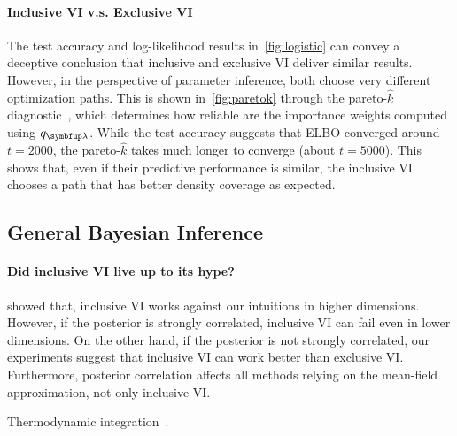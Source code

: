 \vspace{-0.1in}
\paragraph{Inclusive VI v.s. Exclusive VI}
The test accuracy and log-likelihood results in~\cref{fig:logistic} can convey a deceptive conclusion that inclusive and exclusive VI deliver similar results.
However, in the perspective of parameter inference, both choose very different optimization paths.
This is shown in~\cref{fig:paretok} through the pareto-\(\widehat{k}\) diagnostic~\citep{vehtari_pareto_2021, NEURIPS2020_7cac11e2}, which determines how reliable are the importance weights computed using \(q_{\vlambda}\).
While the test accuracy suggests that ELBO converged around \(t=2000\), the pareto-\(\widehat{k}\) takes much longer to converge (about \(t=5000\)).
This shows that, even if their predictive performance is similar, the inclusive VI chooses a path that has better density coverage as expected.

\subsection{General Bayesian Inference}
\paragraph{Did inclusive VI live up to its hype?}
\citet{dhaka_challenges_2021} showed that, inclusive VI works against our intuitions in higher dimensions.
However, if the posterior is strongly correlated, inclusive VI can fail even in lower dimensions.
On the other hand, if the posterior is not strongly correlated, our experiments suggest that inclusive VI can work better than exclusive VI.
Furthermore, posterior correlation affects all methods relying on the mean-field approximation, not only inclusive VI.

Thermodynamic integration~\citep{gelman_simulating_1998, neal_annealed_2001}.

